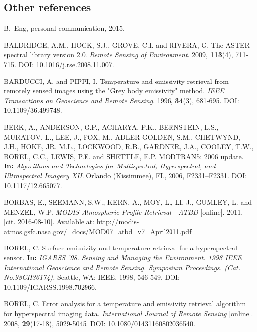 \begin{thebibliography}{10}

\section*{Other references}


B.~Eng, personal communication, 2015.

 BALDRIDGE, A.M., HOOK, S.J., GROVE, C.I. and RIVERA, G. The ASTER spectral library version 2.0. \textit{Remote Sensing of Environment}. 2009, \textbf{113}(4), 711-715. DOI: 10.1016/j.rse.2008.11.007.

 BARDUCCI, A. and PIPPI, I. Temperature and emissivity retrieval from remotely sensed images using the "Grey body emissivity" method. \textit{IEEE Transactions on Geoscience and Remote Sensing}. 1996, \textbf{34}(3), 681-695. DOI: 10.1109/36.499748.

 BERK, A., ANDERSON, G.P., ACHARYA, P.K., BERNSTEIN, L.S., MURATOV, L., LEE, J., FOX, M., ADLER-GOLDEN, S.M., CHETWYND, J.H., HOKE, JR. M.L., LOCKWOOD, R.B., GARDNER, J.A., COOLEY, T.W., BOREL, C.C., LEWIS, P.E. and SHETTLE, E.P. MODTRAN5: 2006 update. \textbf{In:} \textit{Algorithms and Technologies for Multispectral, Hyperspectral, and Ultraspectral Imagery XII}. Orlando (Kissimmee), FL, 2006, F2331--F2331. DOI: 10.1117/12.665077.

 BORBAS, E., SEEMANN, S.W., KERN, A., MOY, L., LI, J., GUMLEY, L. and MENZEL, W.P. \textit{MODIS Atmospheric Profile Retrieval - ATBD} [online]. 2011. [cit. 2016-08-10]. Available at: http://modis-atmos.gsfc.nasa.gov/\_docs/MOD07\_atbd\_v7\linebreak\_April2011.pdf

 BOREL, C. Surface emissivity and temperature retrieval for a hyperspectral sensor. \textbf{In:} \textit{IGARSS '98. Sensing and Managing the Environment. 1998 IEEE International Geoscience and Remote Sensing. Symposium Proceedings. (Cat. No.98CH36174).} Seattle, WA: IEEE, 1998, 546-549. DOI: 10.1109/IGARSS.1998.702966.

 BOREL, C. Error analysis for a temperature and emissivity retrieval algorithm for hyperspectral imaging data. \textit{International Journal of Remote Sensing} [online]. 2008, \textbf{29}(17-18), 5029-5045. DOI: 10.1080/01431160802036540.


\end{thebibliography}
